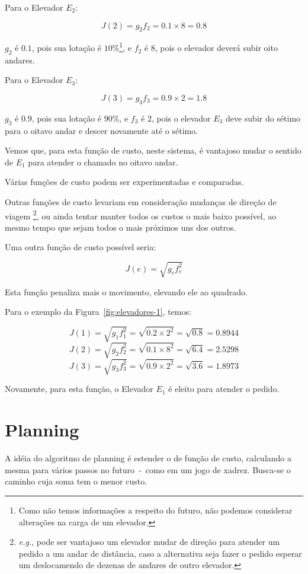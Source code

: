 Para o Elevador $E_{2}$:

\[J(2) = g_{2}f_{2} = 0.1 \times 8 = 0.8\]

$g_{2}$ é $0.1$, pois sua lotação é $10\%$\footnote{Como não temos informações a
respeito do futuro, não podemos considerar alterações na carga de um elevador.},
e $f_{2}$ é $8$, pois o elevador deverá subir oito andares.

Para o Elevador $E_{3}$:

\[J(3) = g_{3}f_{3} = 0.9 \times 2 = 1.8\]

$g_{3}$ é $0.9$, pois sua lotação é $90\%$, e $f_{3}$ é $2$, pois o elevador
$E_{3}$ deve subir do sétimo para o oitavo andar e descer novamente até o sétimo.

Vemos que, para esta função de custo, neste sistema, é vantajoso mudar o sentido
de $E_{1}$ para atender o chamado no oitavo andar.

Várias funções de custo podem ser experimentadas e comparadas.

Outras funções de custo levariam em consideração mudanças de direção de viagem
\footnote{\textit{e.g.}, pode ser vantajoso um elevador mudar de direção para atender um
pedido a um andar de distância, caso a alternativa seja fazer o pedido esperar
um deslocamendo de dezenas de andares de outro elevador.}, ou ainda tentar
manter todos os custos o mais baixo possível, ao mesmo tempo que sejam todos o
mais próximos uns dos outros.

Uma outra função de custo possível seria:

\[J(e) = \sqrt{g_{e}f_{e}^{2}}\]

Esta função penaliza mais o movimento, elevando ele ao quadrado.

Para o exemplo da Figura~\ref{fig:elevadores-1}, temos:

\[J(1) = \sqrt{g_{1}f_{1}^{2}} = \sqrt{0.2 \times 2^2} = \sqrt{0.8} = 0.8944\]
\[J(2) = \sqrt{g_{2}f_{2}^{2}} = \sqrt{0.1 \times 8^2} = \sqrt{6.4} = 2.5298\]
\[J(3) = \sqrt{g_{3}f_{3}^{2}} = \sqrt{0.9 \times 2^2} = \sqrt{3.6} = 1.8973\]

Novamente, para esta função, o Elevador $E_{1}$ é eleito para atender o pedido.

\section{Planning}


A idéia do algoritmo de planning é estender o de função de custo, calculando a
mesma para vários passos no futuro~-~como em um jogo de xadrez. Busca-se o
caminho cuja soma tem o menor custo.

